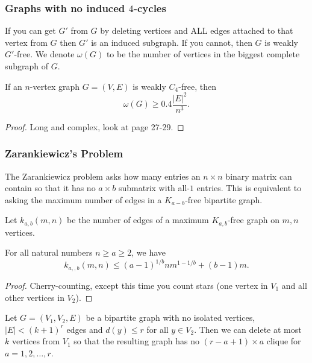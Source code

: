 \subsubsection{Graphs with no induced $4$-cycles}

If you can get $G'$ from $G$ by deleting vertices and ALL edges attached to that vertex from $G$ then $G'$ is an induced subgraph. If you cannot, then $G$ is weakly $G'$-free. We denote $\omega(G)$ to be the number of vertices in the biggest complete subgraph of $G$.

\begin{theorem}
	If an $n$-vertex graph $G=(V,E)$ is weakly $C_4$-free, then 
	$$\omega(G)\geq 0.4\frac{|E|^2}{n^3}.$$
\end{theorem}
\begin{proof}
	Long and complex, look at page 27-29.
\end{proof}

\subsubsection{Zarankiewicz's Problem}

The Zarankiewicz problem asks how many entries an $n\times n$ binary matrix can contain so that it has no $a\times b$ submatrix with all-$1$ entries. This is equivalent to asking the maximum number of edges in a $K_{a-b}$-free bipartite graph.

Let $k_{a,b}(m,n)$ be the number of edges of a maximum $K_{a,b}$-free graph on $m,n$ vertices.

\begin{theorem}
	For all natural numbers $n\geq a\geq 2$, we have
	$$k_{a,,b}(m,n)\leq (a-1)^{1/b}nm^{1-1/b}+(b-1)m.$$
\end{theorem}

\begin{proof}
	Cherry-counting, except this time you count stars (one vertex in $V_1$ and all other vertices in $V_2$).
\end{proof}

\begin{theorem}[Ossowski 1993]
	Let $G=(V_1,V_2,E)$ be a bipartite graph with no isolated vertices, $|E|<(k+1)^r$ edges and $d(y)\leq r$ for all $y\in V_2$. Then we can delete at most $k$ vertices from $V_1$ so that the resulting graph has no $(r-a+1)\times a$ clique for $a=1,2,\dots,r$.
\end{theorem}




